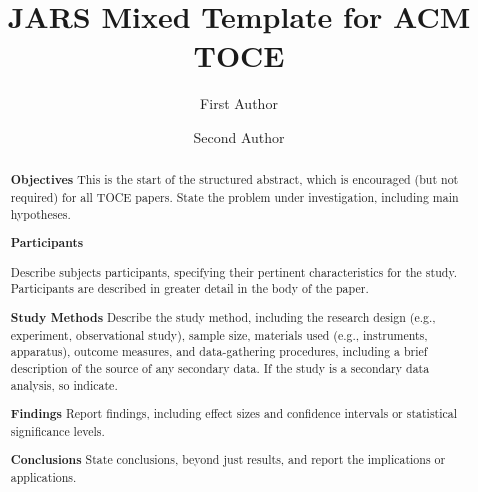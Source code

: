 \documentclass[acmsmall,screen,anonymous,review]{acmart}
\begin{document}
\title[JARS Mixed Template for ACM TOCE]{JARS Mixed Template for ACM TOCE}

\author{First Author}

\author{Second Author}

\renewcommand{\shortauthors}{Author et al.}

\newcommand{\AbstractCategory}[1]{%
  \par\addvspace{.5\baselineskip}%
  \noindent\textbf{#1}\quad\ignorespaces
}

%
\begin{abstract}
\AbstractCategory{Objectives}This is the start of the structured abstract, which is encouraged (but not required) for all TOCE papers. State the problem under investigation, including main hypotheses.


\AbstractCategory{Participants}
Describe subjects participants, specifying their pertinent characteristics for the study. Participants are described in greater detail in the body of the paper.

\AbstractCategory{Study Methods} Describe the study method, including the research design (e.g., experiment, observational study), sample size, materials used (e.g., instruments, apparatus), outcome measures, and data-gathering procedures, including a brief description of the source of any secondary data. If the study is a secondary data analysis, so indicate.

\AbstractCategory{Findings} Report findings, including effect sizes and confidence intervals or statistical significance levels.

\AbstractCategory{Conclusions} State conclusions, beyond just results, and report the implications or applications.

\end{abstract}
\end{document}
